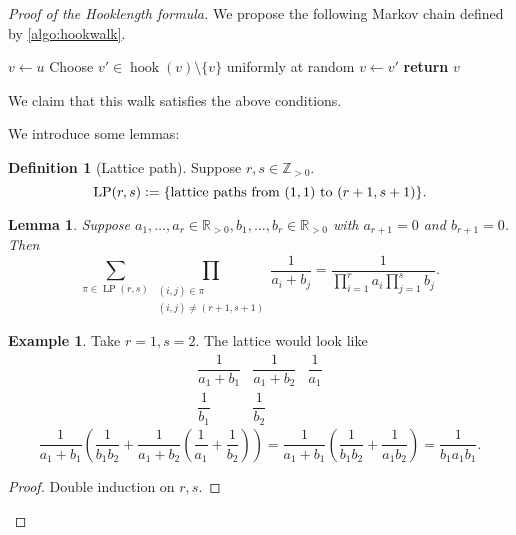 \documentclass{report}
\newcommand{\R}{\mathbb{R}}
\newcommand{\Z}{\mathbb{Z}}
\def \del {\operatorname{del}}
\newcommand{\defeq}{\vcentcolon=}
\newtheorem{lemma}{Lemma}[section]
\theoremstyle{definition}
\newtheorem{definition}{Definition}[section]
\newtheorem{example}{Example}[section]
\theoremstyle{remark}
\numberwithin{equation}{section}
\begin{document}
\begin{proof}[Proof of the Hooklength formula]
We propose the following Markov chain defined by \autoref{algo:hookwalk}.
\begin{algorithm}[h]
    \caption{The Hook Walk}
    \label{algo:hookwalk}
    \begin{algorithmic}[1]
            \State $v \gets u$
            \While{$v \notin \del(\lambda)$} 
                \State Choose $v' \in \operatorname{hook}(v) \setminus \{v\}$ uniformly at random
                \State $v \gets v'$
            \EndWhile
            \State \textbf{return} $v$
        \EndFunction
    \end{algorithmic}
\end{algorithm}
We claim that this walk satisfies the above conditions.

We introduce some lemmas:
\begin{definition}[Lattice path]
    Suppose $r, s \in \Z_{>0}$. \[\operatorname{LP}(r, s) \defeq \{\text{lattice paths from $(1, 1)$ to $(r + 1, s + 1)$}\}.\]
\end{definition}
\begin{lemma}\label{le:latticepath}
    Suppose $a_1, \ldots, a_r \in \R_{>0}, b_1, \ldots, b_r \in \R_{>0}$ with $a_{r + 1} = 0$ and $b_{r + 1} = 0$. Then \begin{equation}\label{latticepath}
        \sum_{\pi \in \operatorname{LP}(r, s)} \prod_{\substack{(i, j) \in \pi \\ (i, j) \neq (r+1, s+1)}} \frac{1}{a_i + b_j} = \frac{1}{\prod_{i=1}^r a_i\prod_{j=1}^s b_j}.
    \end{equation}
\end{lemma}
\begin{example}
    Take $r = 1, s = 2$. The lattice would look like \[\begin{array}{ccc}
        \dfrac{1}{a_1 + b_1} & \dfrac{1}{a_1 + b_2} & \dfrac{1}{a_1} \\[1em]
        \dfrac{1}{b_1} & \dfrac{1}{b_2} &
    \end{array}\]
    \[
        \frac{1}{a_1 + b_1}\left(\frac{1}{b_1b_2} + \frac{1}{a_1 + b_2}\left(\frac{1}{a_1} + \frac{1}{b_2}\right)\right) = \frac{1}{a_1 + b_1}\left(\frac{1}{b_1b_2} + \frac{1}{a_1b_2}\right) = \frac{1}{b_1a_1b_1}.
    \]  
\end{example}

\begin{proof} 
    Double induction on $r, s$.


\end{proof}
\end{proof}
\end{document}
